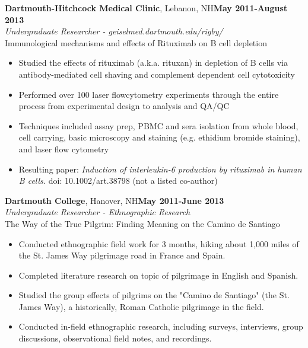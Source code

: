 \documentclass[a4paper, 12pt]{article}
\begin{document}
\noindent
{\bf Dartmouth-Hitchcock Medical Clinic}{, Lebanon, NH}\hfill {\bf May 2011-August 2013 \\}
{\sl Undergraduate Researcher - geiselmed.dartmouth.edu/rigby/}\\
Immunological mechanisms and effects of Rituximab on B cell depletion\\[-6mm]
\begin{itemize}[leftmargin=5mm] 
\itemsep -2pt
	\item Studied the effects of rituximab (a.k.a. rituxan) in depletion of B cells via antibody-mediated cell shaving and complement dependent cell cytotoxicity
	\item Performed over 100 laser flowcytometry experiments through the entire process from experimental design to analysis and QA/QC
	\item Techniques included assay prep, PBMC and sera isolation from whole blood, cell carrying, basic microscopy and staining (e.g. ethidium bromide staining), and laser flow cytometry
	\item Resulting paper: {\sl Induction of interleukin-6 production by rituximab in human B cells.} doi: 10.1002/art.38798 (not a listed co-author)
\end{itemize}

\noindent
{\bf Dartmouth College}{, Hanover, NH}\hfill {\bf May 2011-June 2013 \\}
{\sl Undergraduate Researcher - Ethnographic Research}\\
The Way of the True Pilgrim: Finding Meaning on the Camino de Santiago\\[-6mm]
\begin{itemize}[leftmargin=5mm] 
\itemsep -2pt
	\item Conducted ethnographic field work for 3 months, hiking about 1,000 miles of the St. James Way pilgrimage road in France and Spain.
	\item Completed literature research on topic of pilgrimage in English and Spanish.
	\item Studied the group effects of pilgrims on the "Camino de Santiago" (the St. James Way), a historically, Roman Catholic pilgrimage in the field.
	\item Conducted in-field ethnographic research, including surveys, interviews, group discussions, observational field notes, and recordings.
\end{itemize}
\end{document}
